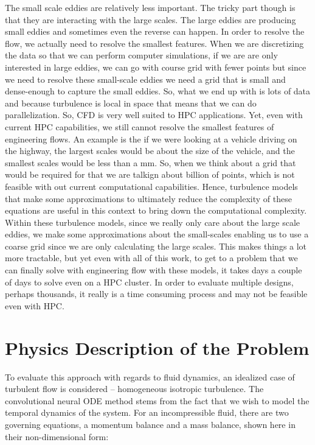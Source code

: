 The small scale eddies are relatively less important. The tricky part though is that they are interacting with the large scales. The large eddies are producing small eddies and sometimes even the reverse can happen. In order to resolve the flow, we actually need to resolve the smallest features. When we are discretizing the data so that we can perform computer simulations, if we are are only interested in large eddies, we can go with course grid with fewer points but since we need to resolve these small-scale eddies we need a grid that is small and dense-enough to capture the small eddies. So, what we end up with is lots of data and because turbulence is local in space that means that we can do parallelization. So, CFD is very well suited to HPC applications. Yet, even with current HPC capabilities, we still cannot resolve the smallest features of engineering flows. An example is the if we were looking at a vehicle driving on the highway, the largest scales would be about the size of the vehicle, and the smallest scales would be less than a mm. So, when we think about a grid that would be required for that we are talkign about billion of points, which is not feasible with out current computational capabilities. Hence, turbulence models that make some approximations to ultimately reduce the complexity of these equations are useful in this context to bring down the computational complexity. Within these turbulence models, since we really only care about the large scale eddies, we make some approximations about the small-scales enabling us to use a coarse grid since we are only calculating the large scales. This makes things a lot more tractable, but yet even with all of this work, to get to a problem that we can finally solve with engineering flow with these models, it takes days a couple of days to solve even on a HPC cluster. In order to evaluate multiple designs, perhaps thousands, it really is a time consuming process and may not be feasible even with HPC. 

\section{Physics Description of the Problem}
To evaluate this approach with regards to fluid dynamics, an idealized case of turbulent
flow is considered – homogeneous isotropic turbulence. The convolutional neural ODE method stems from the fact
that we wish to model the temporal dynamics of the system. For an incompressible fluid, there are two
governing equations, a momentum balance and a mass balance, shown here in their non-dimensional
form:

